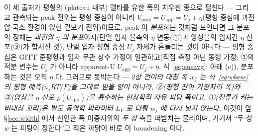 \documentclass[11pt,a4paper]{article}
\newcommand{\app}{\mathrm{app}}
\begin{document}
이 세 출처가 평형의 (plateau 내부) 델타를 유한 폭의 치우친 종으로 펼친다 — 그리고 관측되는 peak 전위는 평형 중심이
아니라 $V_\mathrm{peak}=U_\app=U_j+\eta$(평형 중심에 과전압$\cdot$국소 환경이 얹힌 겉보기 전위)이므로, peak 이
\emph{분포}하는 것처럼 보인다면 그 분포의 정체는 \emph{과전압 $\eta$ 의 분포}이지(단일 입자 율속의 $\eta$ 변동(①)과
앙상블의 입자간 $\eta$ 산포(③)가 합쳐진 것), 단일 입자 평형 중심 $U_j$ 자체가 흔들리는 것이 아니다 — 평형 중심은
GITT 준평형과 입자 무관 상수 가정이 일관하고(직접 측정 아닌 동형 가정; ③의 적분 변수는 $U_j$ 가 아니라 apparent-U $U_\app=U_j+\eta$, 식~\eqref{eq:ensavg};
아래 (c)), 분포하는 것은 오직 $\eta$ 다. 그러므로 못박는다 — \emph{2상 전이의 대칭 폭 $w_j$ 는 식~\eqref{eq:wbase} 의
평형 예측($n_jRT/F$)을 그대로 믿을 양이 아니라, ②(평형 잔여 가장자리 폭)와 ③(앙상블 $\eta$ 산포 $\rho(U_\app)$)을
흡수하는 현상학적 자유 피팅 폭이고, ①(전류가 켜는 비대칭 꼬리)은 별도 동역학 파라미터 $L_V$ 로 다뤄 $w_j$ 에 다시 넣지 않는다.} 이것이 앞 \S\ref{sec:width} 에서 선언한
폭 이중지위의 \emph{두-상} 측을 떠받치는 물리이며, 거기서 ``두-상 $w$ 는 피팅이 정한다''고 적은 까닭이 바로 이 broadening 이다.
\end{document}
